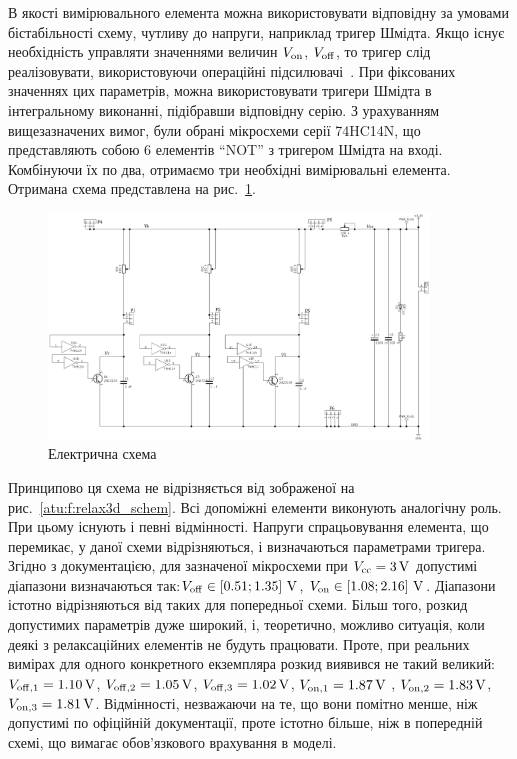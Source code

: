 В якості вимірювального елемента можна використовувати
відповідну за умовами бістабільності схему, чутливу до напруги,
наприклад тригер Шмідта. Якщо існує необхідність управляти
значеннями величин
$ V _\mathrm{on} $,
$ V _\mathrm{off} $, то тригер слід реалізовувати, використовуючи
операційні підсилювачі~\cite{horowitz}. При фіксованих значеннях
цих параметрів, можна використовувати тригери Шмідта в
інтегральному виконанні, підібравши відповідну серію. З
урахуванням вищезазначених вимог, були обрані мікросхеми
серії 74HC14N, що представляють собою 6 елементів ``NOT'' з тригером
Шмідта на вході. Комбінуючи їх по два, отримаємо три необхідні
вимірювальні елемента. Отримана схема представлена на
рис.~\ref{atu:f:relax3ds_schem}.


\begin{figure}[htb!]
  \centerline{\includegraphics[width=0.9\textwidth]{p/relax3ds_schem.png} }
\caption{Електрична схема \RelaxShIi}
\label{atu:f:relax3ds_schem}
\end{figure}

Принципово ця схема не відрізняється від зображеної
на рис.~\ref{atu:f:relax3d_schem}. Всі допоміжні елементи виконують
аналогічну роль. При цьому існують і певні відмінності. Напруги
спрацьовування  елемента, що перемикає, у даної схеми
відрізняються, і визначаються параметрами тригера. Згідно з
документацією, для зазначеної мікросхеми при
$ V _\mathrm{cc} = \SI{3}{\volt} $ допустимі діапазони визначаються так:$ V _\mathrm{off}
\in [0.51; 1.35]~\SI{}{\volt} $,
$ V _\mathrm{on} \in [1.08; 2.16]~\SI{}{\volt} $. Діапазони істотно відрізняються
від таких для попередньої схеми. Більш того, розкид допустимих
параметрів дуже широкий, і, теоретично, можливо ситуація, коли
деякі з релаксаційних елементів не будуть працювати. Проте,
при реальних вимірах для одного конкретного екземпляра розкид
виявився не такий великий:
$ V _\mathrm{off, 1} = \SI{1.10}{\volt} $,
$ V _\mathrm{off, 2} = \SI{1.05}{\volt} $,
$ V _\mathrm{off, 3} = \SI{1.02}{\volt} $,
$ V _\mathrm{on, 1} = \SI{1.87}{\volt} $ ,
$ V _\mathrm{on, 2} = \SI{1.83}{\volt} $,
$ V _\mathrm{on, 3} = \SI{1.81}{\volt} $. Відмінності, незважаючи на те, що вони
помітно менше, ніж допустимі по офіційній документації, проте
істотно більше, ніж в попередній схемі, що вимагає обов'язкового
врахування в моделі.

